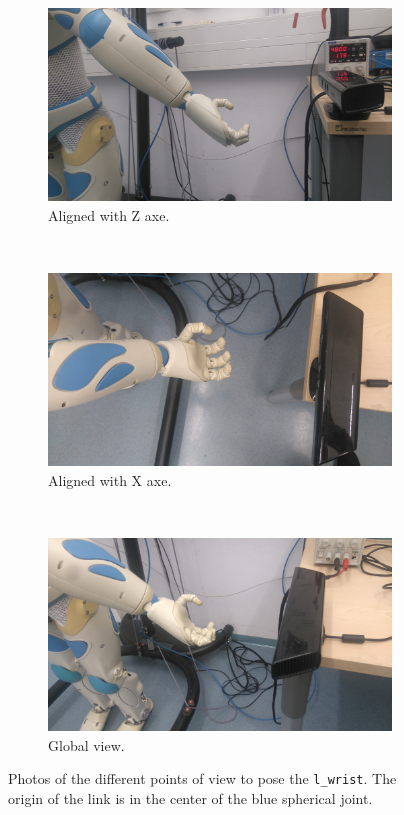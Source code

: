 \documentclass[12pt,a4paper,final,twoside,openright]{report}
\begin{document}
\begin{figure}[h]
\centering
\begin{subfigure}[r]{0.45\textwidth}
		\includegraphics[width=\textwidth]{images/DSC_0005.JPG}
        \caption{Aligned with Z axe.}
\end{subfigure}
~
\begin{subfigure}[r]{0.45\textwidth}
		\includegraphics[width=\textwidth]{images/DSC_0006.JPG}
        \caption{Aligned with X axe.}
\end{subfigure}
\\
\begin{subfigure}[r]{0.45\textwidth}
		\includegraphics[width=\textwidth]{images/DSC_0007.JPG}
        \caption{Global view.}
\end{subfigure}
\caption{Photos of the different points of view to pose the \texttt{l\_wrist}. The origin of the link is in the center of the blue spherical joint.\label{fig:camera_preknown_photos}}
\end{figure}
\end{document}
